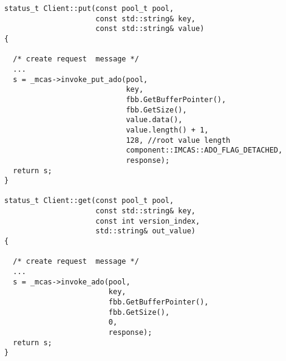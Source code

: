 \newpage

\begin{lstlisting}[caption={Client-side for ADO versioning},
captionpos=b, label={lst:client versioning}, 
frame=none]
status_t Client::put(const pool_t pool,
                     const std::string& key,
                     const std::string& value)
{

  /* create request  message */
  ...
  s = _mcas->invoke_put_ado(pool,
                            key,
                            fbb.GetBufferPointer(),
                            fbb.GetSize(),
                            value.data(),
                            value.length() + 1, 
                            128, //root value length
                            component::IMCAS::ADO_FLAG_DETACHED,
                            response);
  return s;
}

status_t Client::get(const pool_t pool,
                     const std::string& key,
                     const int version_index,
                     std::string& out_value)
{

  /* create request  message */
  ...
  s = _mcas->invoke_ado(pool,
                        key,
                        fbb.GetBufferPointer(),
                        fbb.GetSize(),
                        0,
                        response);
  return s;
}

\end{lstlisting}


